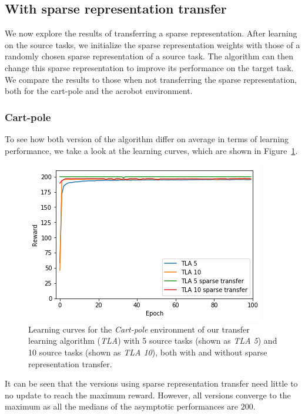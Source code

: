 \subsection{With sparse representation transfer} %
\label{sub:cartpole:with_sparse_representation_transfer}
We now explore the results of transferring a sparse representation. After learning on the source tasks, we initialize the sparse representation weights with those of a randomly chosen sparse representation of a source task. The algorithm can then change this sparse representation to improve its performance on the target task. We compare the results to those when not transferring the sparse representation, both for the cart-pole and the acrobot environment.
\subsubsection{Cart-pole} %
\label{ssub:with_sparse_representation_transfer:cartpole}
To see how both version of the algorithm differ on average in terms of learning performance, we take a look at the learning curves, which are shown in Figure~\ref{fig:CartPole:st:reward_target_without-with}.
\begin{figure}[htb]
    \centering
    \includegraphics[width=.8\linewidth]{images/results/CartPole/sparse_transfer/reward_target_without_with.png}
    \caption[Learning curves for the \textit{Cart-pole} environment of \textit{TLA} with and without sparse representation transfer]{Learning curves for the \emph{Cart-pole} environment of our transfer learning algorithm (\textit{TLA}) with 5 source tasks (shown as \textit{TLA 5}) and 10 source tasks (shown as \textit{TLA 10}), both with and without sparse representation transfer.}
    \label{fig:CartPole:st:reward_target_without-with}
\end{figure}
It can be seen that the versions using sparse representation transfer need little to no update to reach the maximum reward. However, all versions converge to the maximum as all the medians of the asymptotic performances are $200$.

